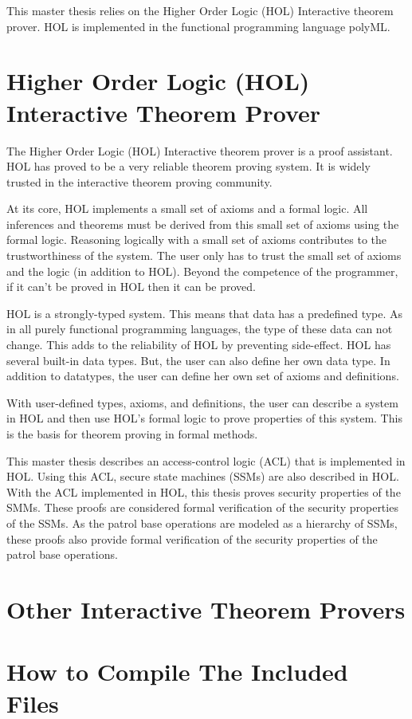 \documentclass[../../main/main.tex]{subfiles}
\begin{document}
This master thesis relies on the Higher Order Logic (HOL) Interactive theorem prover.  HOL is implemented in the functional programming language polyML.

\section{Higher Order Logic (HOL) Interactive Theorem Prover}
The Higher Order Logic (HOL) Interactive theorem prover is a proof assistant.  HOL has proved to be a very reliable theorem proving system.  It is widely trusted in the interactive theorem proving community.

At its core, HOL implements a small set of axioms and a formal logic.  All inferences and theorems must be derived from this small set of axioms using the formal logic.  Reasoning logically with a small set of axioms contributes to the trustworthiness of the system.  The user only has to trust the small set of axioms and the logic (in addition to HOL).  Beyond the competence of the programmer, if it can't be proved in HOL then it can be proved.  

HOL is a strongly-typed system.  This means that data has a predefined type.  As in all purely functional programming languages, the type of these data can not change.  This adds to the reliability of HOL by preventing side-effect. HOL has several built-in data types.  But, the user can also define her own data type.   In addition to datatypes, the user can define her own set of axioms and definitions.  

With user-defined types, axioms, and definitions, the user can describe a system in HOL and then use HOL's formal logic to prove properties of this system.  This is the basis for theorem proving in formal methods.

This master thesis describes an access-control logic (ACL) that is implemented in HOL.  Using this ACL, secure state machines (SSMs) are also described in HOL.  With the ACL implemented in HOL, this thesis proves security properties of the SMMs.  These proofs are considered formal verification of the security properties of the SSMs.  As the patrol base operations are modeled as a hierarchy of SSMs, these proofs also provide formal verification of the security properties of the patrol base operations.


\section{Other Interactive Theorem Provers}
\section{How to Compile The Included Files}
\end{document}
